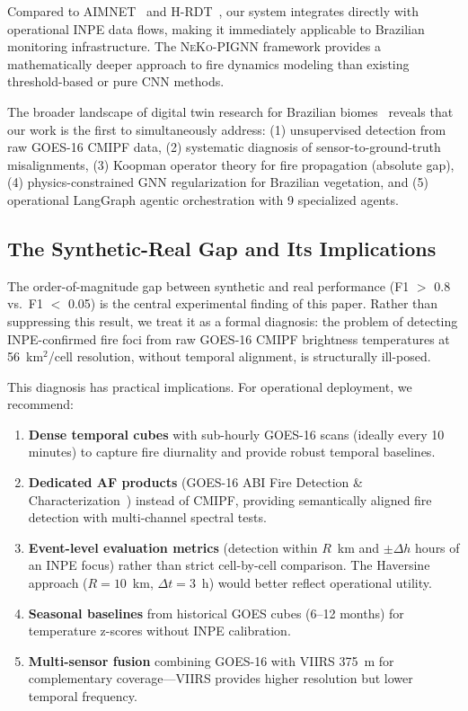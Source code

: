 \documentclass[11pt,twocolumn,a4paper]{article}
\newcommand{\abbrev}[1]{{\small\textsc{#1}}}
\begin{document}
Compared to \abbrev{AIMNET}~\cite{zhou2025} and \abbrev{H-RDT}~\cite{shen2025}, our system integrates directly with operational \abbrev{INPE} data flows, making it immediately applicable to Brazilian monitoring infrastructure. The \abbrev{NeKo-PIGNN} framework provides a mathematically deeper approach to fire dynamics modeling than existing threshold-based or pure \abbrev{CNN} methods.

The broader landscape of digital twin research for Brazilian biomes~\cite{prapas2023,lee2026,mukkavilli2023} reveals that our work is the first to simultaneously address: (1) unsupervised detection from raw \abbrev{GOES-16} \abbrev{CMIPF} data, (2) systematic diagnosis of sensor-to-ground-truth misalignments, (3) Koopman operator theory for fire propagation (absolute gap), (4) physics-constrained \abbrev{GNN} regularization for Brazilian vegetation, and (5) operational LangGraph agentic orchestration with 9 specialized agents.

\subsection{The Synthetic-Real Gap and Its Implications}

The order-of-magnitude gap between synthetic and real performance (F1 $>$ 0.8 vs.\ F1 $<$ 0.05) is the central experimental finding of this paper. Rather than suppressing this result, we treat it as a formal diagnosis: the problem of detecting INPE-confirmed fire foci from raw \abbrev{GOES-16} \abbrev{CMIPF} brightness temperatures at 56~km$^2$/cell resolution, without temporal alignment, is structurally ill-posed.

This diagnosis has practical implications. For operational deployment, we recommend:
\begin{enumerate}
  \item \textbf{Dense temporal cubes} with sub-hourly \abbrev{GOES-16} scans (ideally every 10 minutes) to capture fire diurnality and provide robust temporal baselines.
  \item \textbf{Dedicated \abbrev{AF} products} (\abbrev{GOES-16} \abbrev{ABI} Fire Detection \& Characterization~\cite{schmidt2021}) instead of \abbrev{CMIPF}, providing semantically aligned fire detection with multi-channel spectral tests.
  \item \textbf{Event-level evaluation metrics} (detection within $R$~km and $\pm \Delta h$ hours of an \abbrev{INPE} focus) rather than strict cell-by-cell comparison. The Haversine approach ($R = 10$~km, $\Delta t = 3$~h) would better reflect operational utility.
  \item \textbf{Seasonal baselines} from historical \abbrev{GOES} cubes (6--12 months) for temperature z-scores without \abbrev{INPE} calibration.
  \item \textbf{Multi-sensor fusion} combining \abbrev{GOES-16} with \abbrev{VIIRS} 375~m for complementary coverage---\abbrev{VIIRS} provides higher resolution but lower temporal frequency.
\end{enumerate}
\end{document}
